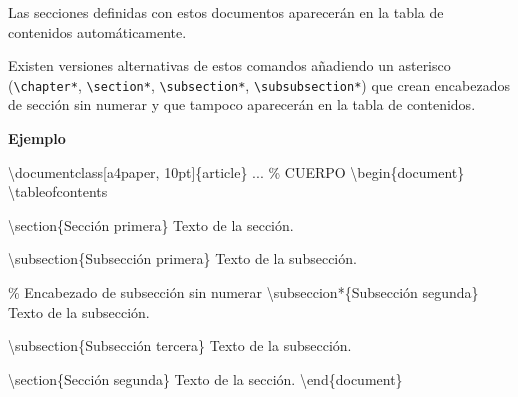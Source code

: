 \documentclass[
  letterpaper,
  DIV=11,
  numbers=noendperiod]{scrreport}
\newenvironment{Shaded}{\begin{snugshade}}{\end{snugshade}}
\newcommand{\BuiltInTok}[1]{\textcolor[rgb]{0.00,0.23,0.31}{#1}}
\newcommand{\CommentTok}[1]{\textcolor[rgb]{0.37,0.37,0.37}{#1}}
\newcommand{\ExtensionTok}[1]{\textcolor[rgb]{0.00,0.23,0.31}{#1}}
\newcommand{\FunctionTok}[1]{\textcolor[rgb]{0.28,0.35,0.67}{#1}}
\newcommand{\KeywordTok}[1]{\textcolor[rgb]{0.00,0.23,0.31}{#1}}
\newcommand{\NormalTok}[1]{\textcolor[rgb]{0.00,0.23,0.31}{#1}}
\begin{document}
Las secciones definidas con estos documentos aparecerán en la tabla de
contenidos automáticamente.

Existen versiones alternativas de estos comandos añadiendo un asterisco
(\texttt{\textbackslash{}chapter*}, \texttt{\textbackslash{}section*},
\texttt{\textbackslash{}subsection*},
\texttt{\textbackslash{}subsubsection*}) que crean encabezados de
sección sin numerar y que tampoco aparecerán en la tabla de contenidos.

\textbf{Ejemplo}

\begin{Shaded}
\begin{Highlighting}[]
\BuiltInTok{\textbackslash{}documentclass}\NormalTok{[a4paper, 10pt]\{}\ExtensionTok{article}\NormalTok{\}}
\NormalTok{...}
\CommentTok{\% CUERPO}
\KeywordTok{\textbackslash{}begin}\NormalTok{\{}\ExtensionTok{document}\NormalTok{\}}
\FunctionTok{\textbackslash{}tableofcontents}

\KeywordTok{\textbackslash{}section}\NormalTok{\{Sección primera\}}
\NormalTok{Texto de la sección.}

\KeywordTok{\textbackslash{}subsection}\NormalTok{\{Subsección primera\}}
\NormalTok{Texto de la subsección.}

\CommentTok{\% Encabezado de subsección sin numerar}
\FunctionTok{\textbackslash{}subseccion*}\NormalTok{\{Subsección segunda\}}
\NormalTok{Texto de la subsección.}

\KeywordTok{\textbackslash{}subsection}\NormalTok{\{Subsección tercera\}}
\NormalTok{Texto de la subsección.}

\KeywordTok{\textbackslash{}section}\NormalTok{\{Sección segunda\}}
\NormalTok{Texto de la sección.}
\KeywordTok{\textbackslash{}end}\NormalTok{\{}\ExtensionTok{document}\NormalTok{\}}
\end{Highlighting}
\end{Shaded}
\end{document}
